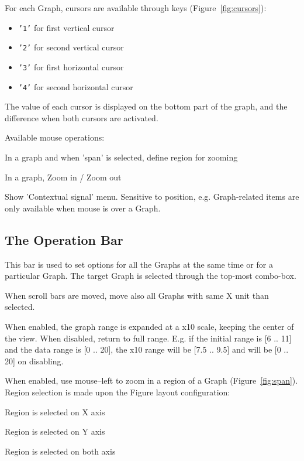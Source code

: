 \documentclass[a4paper,11pt]{report}
\renewenvironment{description}{%
\begin{basedescript}{%
\renewcommand{\makelabel}[1]{\bfseries##1}%
}%
}{%
\end{basedescript}%
}
\begin{document}
For each Graph, cursors are available through keys (Figure~\ref{fig:cursors}):
\begin{itemize}
\item \texttt{'1'} for first vertical cursor
\item \texttt{'2'} for second vertical cursor
\item \texttt{'3'} for first horizontal cursor
\item \texttt{'4'} for second horizontal cursor
\end{itemize}
The value of each cursor is displayed on the bottom part of the graph, and the difference when both cursors are activated.

\noindent Available mouse operations:
\begin{description}
\item[left] In a graph and when 'span' is selected, define region for zooming
\item[roll] In a graph, Zoom in / Zoom out
\item[right] Show 'Contextual signal' menu. Sensitive to position, e.g. Graph-related items are only available when mouse is over a Graph.
\end{description}


\subsection{The Operation Bar}

This bar is used to set options for all the Graphs at the same time or for a particular Graph.
The target Graph is selected through the top-most combo-box.
\begin{description}
\item[Master pan] When scroll bars are moved, move also all Graphs with same X unit than selected.
\item[Zoom x10] When enabled, the graph range is expanded at a x10 scale, keeping the center of the view. When disabled, return to full range. E.g. if the initial range is [6 .. 11] and the data range is [0 .. 20], the x10 range will be [7.5 .. 9.5] and will be [0 .. 20] on disabling.
\item[Span] When enabled, use mouse--left to zoom in a region of a Graph (Figure~\ref{fig:span}). Region selection is made upon the Figure layout configuration:
  \begin{description}
  \item[horizontal] Region is selected on X axis
  \item[vertical] Region is selected on Y axis
  \item[quad] Region is selected on both axis
  \end{description}
\end{description}
\end{document}
